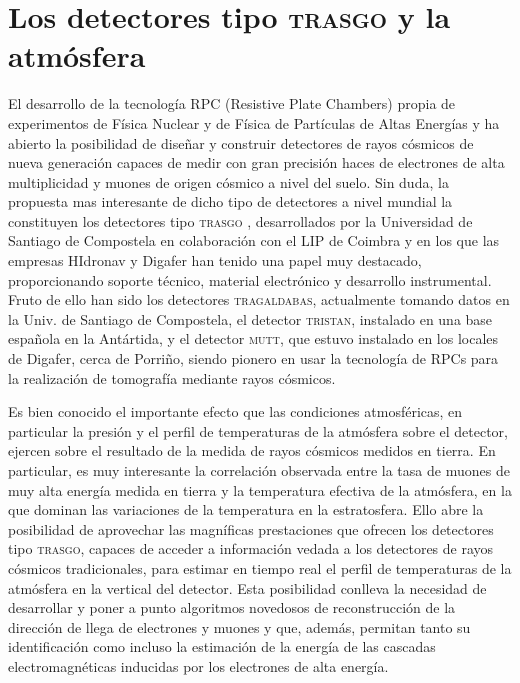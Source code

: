 \documentclass[a4paper]{article}
\begin{document}
\section{Los detectores tipo  \textsc{trasgo} y la atmósfera}

El desarrollo de la tecnología RPC (Resistive Plate Chambers) propia de experimentos de Física Nuclear  y de Física de Partículas de Altas Energías y ha abierto la posibilidad de diseñar y construir detectores de rayos cósmicos de nueva generación capaces de medir con gran precisión haces de electrones de alta multiplicidad y muones de origen cósmico a nivel del suelo. Sin duda, la propuesta mas interesante de dicho tipo de detectores a nivel mundial la constituyen los detectores tipo \textsc{trasgo} \cite{jag, moscu}, desarrollados por la Universidad de Santiago de Compostela en colaboración con el LIP de Coimbra y en los que las empresas HIdronav  y Digafer han tenido una papel muy  destacado, proporcionando soporte técnico, material electrónico y desarrollo instrumental. Fruto de ello han sido los detectores \textsc{tragaldabas}, actualmente tomando datos en la Univ. de Santiago de Compostela, el detector \textsc{tristan}, instalado en una base española en la Antártida, y el detector \textsc{mutt}, que estuvo instalado en los locales de Digafer, cerca de Porriño, siendo pionero en usar la tecnología de RPCs para la realización de tomografía mediante rayos cósmicos. 

Es bien conocido el importante efecto que las condiciones atmosféricas, en particular la presión y el perfil de temperaturas de la atmósfera sobre el detector, ejercen sobre el resultado de la  medida de rayos cósmicos medidos en tierra. En particular, es muy interesante la correlación observada entre la tasa de muones de muy alta energía medida en tierra y la temperatura efectiva de la atmósfera, en la que dominan las variaciones de la temperatura en la estratosfera. Ello abre la posibilidad de aprovechar las magníficas prestaciones que ofrecen los detectores tipo \textsc{trasgo}, capaces de acceder a información vedada a los detectores de rayos cósmicos tradicionales, para estimar en tiempo real el perfil de temperaturas de la atmósfera en la vertical del detector. 
Esta posibilidad conlleva la necesidad de desarrollar y poner a punto algoritmos novedosos de reconstrucción de la dirección de llega de electrones y muones y que, además, permitan tanto su identificación como incluso la estimación de la energía de las cascadas electromagnéticas inducidas por los electrones de alta energía.
\end{document}
